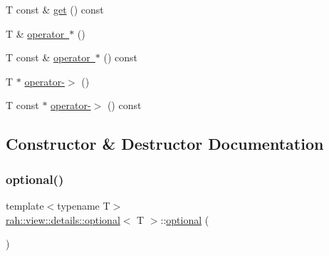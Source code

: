 \begin{DoxyCompactItemize}
T const  \& \mbox{\hyperlink{structrah_1_1view_1_1details_1_1optional_aebb289247c0fac033c260b18c492ffec}{get}} () const
\item 
T \& \mbox{\hyperlink{structrah_1_1view_1_1details_1_1optional_a551608196fdf9f460b841a41402c827a}{operator $\ast$}} ()
\item 
T const  \& \mbox{\hyperlink{structrah_1_1view_1_1details_1_1optional_a8c163253823c31975c789ce15d52703b}{operator $\ast$}} () const
\item 
T $\ast$ \mbox{\hyperlink{structrah_1_1view_1_1details_1_1optional_ab8f628f4039e5f3a86262d710b4a885c}{operator-\/$>$}} ()
\item 
T const  $\ast$ \mbox{\hyperlink{structrah_1_1view_1_1details_1_1optional_aa4e2ccfe9217c1b960092cd44c9305ca}{operator-\/$>$}} () const
\end{DoxyCompactItemize}


\subsection{Constructor \& Destructor Documentation}
\mbox{\label{structrah_1_1view_1_1details_1_1optional_a70b8727b22b0d88c9cc823f818286c71}} 
\subsubsection{\texorpdfstring{optional()}{optional()}\hspace{0.1cm}{\footnotesize\ttfamily [1/3]}}
{\footnotesize\ttfamily template$<$typename T$>$ \\
\mbox{\hyperlink{structrah_1_1view_1_1details_1_1optional}{rah\+::view\+::details\+::optional}}$<$ T $>$\+::\mbox{\hyperlink{structrah_1_1view_1_1details_1_1optional}{optional}} (\begin{DoxyParamCaption}{ }\end{DoxyParamCaption})\hspace{0.3cm}{\ttfamily [default]}}

\mbox{\label{structrah_1_1view_1_1details_1_1optional_a8c15e1445849715fdef5bf9bfdf43a91}} 
